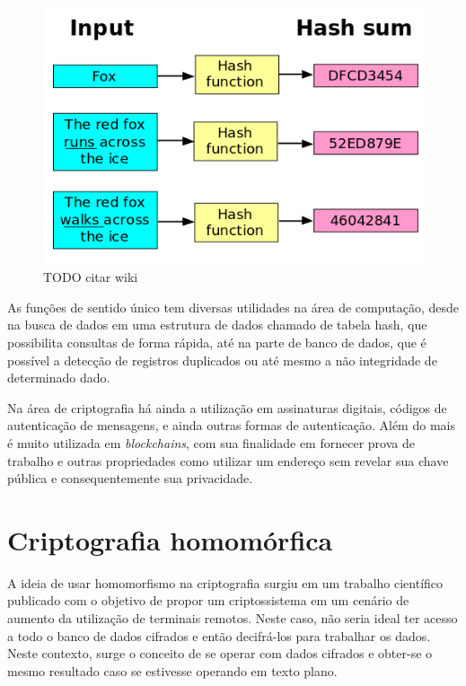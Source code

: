 \documentclass{ufsctex/ufsctex}
\begin{document}
\begin{figure}[H]
	\centering
	\includegraphics[scale=0.35]{hash_function}
	\caption{TODO citar wiki}
	\label{fig:hash}
\end{figure}

As funções de sentido único tem diversas utilidades na área de computação,
desde na busca de dados em uma estrutura de dados chamado de tabela hash, que
possibilita consultas de forma rápida, até na parte de banco de dados, que é
possível a detecção de registros duplicados ou até mesmo a não integridade de
determinado dado.

Na área de criptografia há ainda a utilização em assinaturas digitais, códigos
de autenticação de mensagens, e ainda outras formas de autenticação. Além do
mais é  muito utilizada em \textit{blockchains}, com sua finalidade em fornecer
prova de trabalho e outras propriedades como utilizar um endereço sem revelar
sua chave pública e consequentemente sua privacidade.\cite{hashBlockchain}

\section{Criptografia homomórfica}

A ideia de usar homomorfismo na criptografia surgiu em um trabalho científico
publicado com o objetivo de propor um criptossistema em um cenário de aumento
da utilização de terminais remotos. Neste caso, não seria ideal ter acesso a
todo o banco de dados cifrados e então decifrá-los para trabalhar os dados.
Neste contexto, surge o conceito de se operar com dados cifrados e obter-se o
mesmo resultado caso se estivesse operando em texto plano.\cite{homomorphic}
\end{document}
